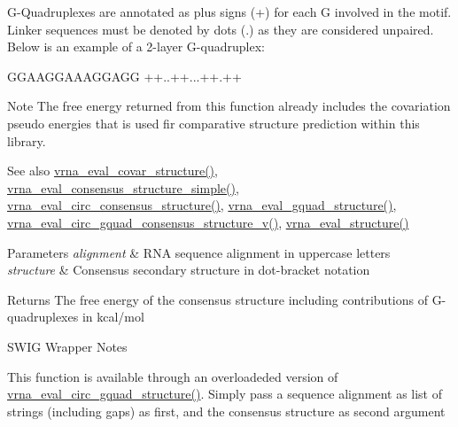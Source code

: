 G-\/\+Quadruplexes are annotated as plus signs (\textquotesingle{}+\textquotesingle{}) for each G involved in the motif. Linker sequences must be denoted by dots (\textquotesingle{}.\textquotesingle{}) as they are considered unpaired. Below is an example of a 2-\/layer G-\/quadruplex\+: 
\begin{DoxyCode}
GGAAGGAAAGGAGG
++..++...++.++
\end{DoxyCode}


\begin{DoxyNote}{Note}
The free energy returned from this function already includes the covariation pseudo energies that is used fir comparative structure prediction within this library.
\end{DoxyNote}
\begin{DoxySeeAlso}{See also}
\hyperlink{group__eval_ga6cea75c0eb9857fb59172be54cab09e0}{vrna\+\_\+eval\+\_\+covar\+\_\+structure()}, \hyperlink{group__eval_ga7762c3a7bdcbc3a14ef93259d322c7d6}{vrna\+\_\+eval\+\_\+consensus\+\_\+structure\+\_\+simple()}, \hyperlink{group__eval_gac96577cf232c71160f762737a994b7c6}{vrna\+\_\+eval\+\_\+circ\+\_\+consensus\+\_\+structure()}, \hyperlink{group__eval_ga3263504825ef4b523eba797c99921df4}{vrna\+\_\+eval\+\_\+gquad\+\_\+structure()}, \hyperlink{group__eval_gaecd3e17292a0b3927277434019a5e187}{vrna\+\_\+eval\+\_\+circ\+\_\+gquad\+\_\+consensus\+\_\+structure\+\_\+v()}, \hyperlink{group__eval_ga58f199f1438d794a265f3b27fc8ea631}{vrna\+\_\+eval\+\_\+structure()}
\end{DoxySeeAlso}

\begin{DoxyParams}{Parameters}
{\em alignment} & R\+NA sequence alignment in uppercase letters \\
\hline
{\em structure} & Consensus secondary structure in dot-\/bracket notation \\
\hline
\end{DoxyParams}
\begin{DoxyReturn}{Returns}
The free energy of the consensus structure including contributions of G-\/quadruplexes in kcal/mol
\end{DoxyReturn}
\begin{DoxyRefDesc}{S\+W\+I\+G Wrapper Notes}
\item[\hyperlink{wrappers__wrappers000042}{S\+W\+I\+G Wrapper Notes}]This function is available through an overloadeded version of \hyperlink{group__eval_ga9dba2fc5d7e6ad1359a7c2f350589c0e}{vrna\+\_\+eval\+\_\+circ\+\_\+gquad\+\_\+structure()}. Simply pass a sequence alignment as list of strings (including gaps) as first, and the consensus structure as second argument \end{DoxyRefDesc}
\mbox{\label{group__eval_ga1c07851f6b665c3461a19e9e4eb33d26}} 
